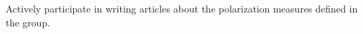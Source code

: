 \documentclass[preview]{standalone}
\begin{document}
Actively participate in writing articles about the polarization measures defined in the group.\\
\end{document}
